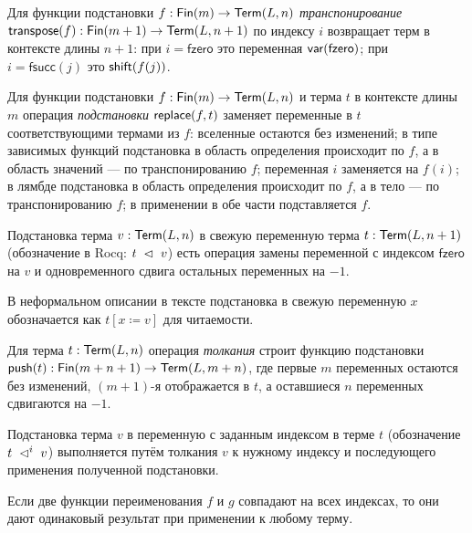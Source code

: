 \begin{definition}[Транспонирование]
Для функции подстановки $f : \mathsf{Fin}(m) \to \mathsf{Term}(L, n)$
\emph{транспонирование} $\mathsf{transpose}(f) : \mathsf{Fin}(m+1) \to
\mathsf{Term}(L, n+1)$ по индексу $i$ возвращает терм в
контексте длины $n+1$: при $i = \mathsf{fzero}$ это
переменная $\mathsf{var}(\mathsf{fzero})$; при
$i = \mathsf{fsucc}(j)$ это $\mathsf{shift}(f(j))$.
\end{definition}

\begin{definition}[Подстановка]
Для функции подстановки $f : \mathsf{Fin}(m) \to \mathsf{Term}(L, n)$ и
терма $t$ в контексте длины $m$ операция
\emph{подстановки} $\mathsf{replace}(f, t)$ заменяет переменные
в $t$ соответствующими термами из $f$: вселенные
остаются без изменений; в типе зависимых функций
подстановка в область определения происходит по $f$, а
в область значений --- по транспонированию $f$;
переменная $i$ заменяется на $f(i)$; в лямбде
подстановка в область определения происходит по $f$, а
в тело --- по транспонированию $f$; в применении в обе 
части подставляется $f$.
\end{definition}

\begin{definition}
Подстановка терма $v:\mathsf{Term}(L,n)$ в свежую переменную
терма $t:\mathsf{Term}(L,n+1)$ (обозначение в Rocq:
$t\;\vartriangleleft\;v$) есть операция замены переменной с
индексом $\mathsf{fzero}$ на $v$ и одновременного
сдвига остальных переменных на $-1$.
\end{definition}
В неформальном описании в тексте подстановка в свежую
переменную $x$ обозначается как $t[x \coloneqq v]$ для
читаемости.

\begin{definition}[Толкание]
Для терма $t:\mathsf{Term}(L,n)$ операция \emph{толкания}
строит функцию подстановки
$\mathsf{push}(t):\mathsf{Fin}(m+n+1)\to\mathsf{Term}(L,m+n)$, где
первые $m$ переменных остаются без изменений, $(m+1)$-я
отображается в $t$, а оставшиеся $n$ переменных
сдвигаются на $-1$.
\end{definition}

\begin{definition}
Подстановка терма $v$ в переменную с заданным индексом
в терме $t$ (обозначение $t\;\vartriangleleft^i\;v$) выполняется
путём толкания $v$ к нужному индексу и последующего
применения полученной подстановки.
\end{definition}

\begin{lemma}
Если две функции переименования $f$ и $g$ совпадают на
всех индексах, то они дают одинаковый результат при
применении к любому терму.
\end{lemma}

